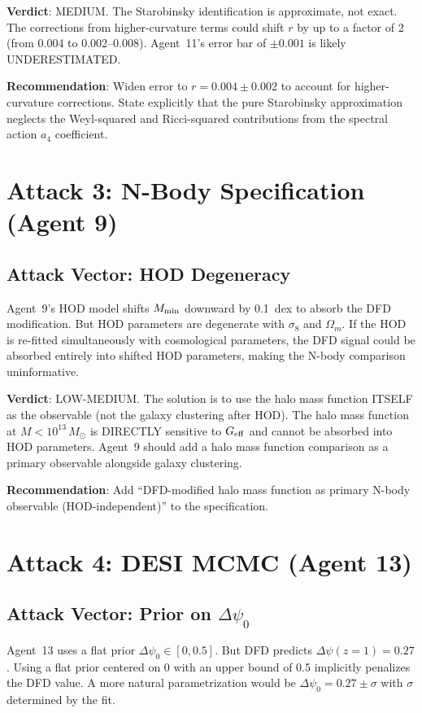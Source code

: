 \documentclass[11pt,a4paper]{article}
\begin{document}
\textbf{Verdict}: MEDIUM. The Starobinsky identification is approximate, not exact. The corrections from higher-curvature terms could shift $r$ by up to a factor of 2 (from 0.004 to 0.002--0.008). Agent~11's error bar of $\pm 0.001$ is likely UNDERESTIMATED.

\textbf{Recommendation}: Widen error to $r = 0.004 \pm 0.002$ to account for higher-curvature corrections. State explicitly that the pure Starobinsky approximation neglects the Weyl-squared and Ricci-squared contributions from the spectral action $a_4$ coefficient.

\section{Attack 3: N-Body Specification (Agent 9)}

\subsection{Attack Vector: HOD Degeneracy}

Agent~9's HOD model shifts $M_{\rm min}$ downward by 0.1~dex to absorb the DFD modification. But HOD parameters are degenerate with $\sigma_8$ and $\Omega_m$. If the HOD is re-fitted simultaneously with cosmological parameters, the DFD signal could be absorbed entirely into shifted HOD parameters, making the N-body comparison uninformative.

\textbf{Verdict}: LOW-MEDIUM. The solution is to use the halo mass function ITSELF as the observable (not the galaxy clustering after HOD). The halo mass function at $M < 10^{13}\,M_\odot$ is DIRECTLY sensitive to $G_{\rm eff}$ and cannot be absorbed into HOD parameters. Agent~9 should add a halo mass function comparison as a primary observable alongside galaxy clustering.

\textbf{Recommendation}: Add ``DFD-modified halo mass function as primary N-body observable (HOD-independent)'' to the specification.

\section{Attack 4: DESI MCMC (Agent 13)}

\subsection{Attack Vector: Prior on $\Delta\psi_0$}

Agent~13 uses a flat prior $\Delta\psi_0 \in [0, 0.5]$. But DFD predicts $\Delta\psi(z=1) = 0.27$. Using a flat prior centered on 0 with an upper bound of 0.5 implicitly penalizes the DFD value. A more natural parametrization would be $\Delta\psi_0 = 0.27 \pm \sigma$ with $\sigma$ determined by the fit.
\end{document}
